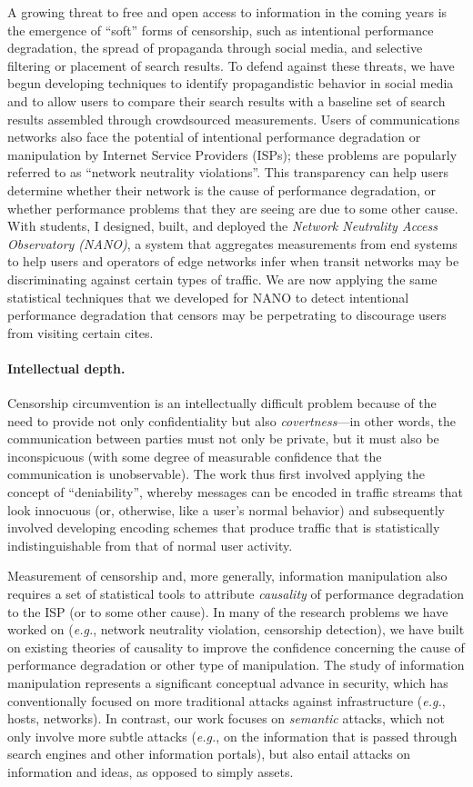 \documentclass{article}
\newcommand{\eg}{{\em e.g.}}
\begin{document}
A growing threat to free and open access to information in the coming
years is the emergence of ``soft'' forms of censorship, such as
intentional performance degradation, the spread of propaganda through
social media, and selective filtering or placement of search results.
To defend against these threats, we have begun developing techniques to
identify propagandistic behavior in social media and to allow users to
compare their search results with a baseline set of search results
assembled through crowdsourced measurements.  Users of communications
networks also face the potential of intentional performance degradation
or manipulation by Internet Service Providers (ISPs); these problems are
popularly referred to as ``network neutrality violations''.  This
transparency can help users determine whether their network is the cause
of performance degradation, or whether performance problems that they
are seeing are due to some other cause.  With students, I designed,
built, and deployed the {\em Network Neutrality Access Observatory
  (NANO)}, a system that aggregates measurements from end systems to
help users and operators of edge networks infer when transit networks
may be discriminating against certain types of traffic.  We are now
applying the same statistical techniques that we developed for NANO to
detect intentional performance degradation that censors may be
perpetrating to discourage users from visiting certain cites.

\paragraph{Intellectual depth.}  Censorship circumvention is an
intellectually difficult problem because of the need to provide not only
confidentiality but also {\em covertness}---in other words, the
communication between parties must not only be private, but it must also
be inconspicuous (with some degree of measurable confidence that the
communication is unobservable).  The work thus first involved
applying the concept of ``deniability'', whereby messages can be
encoded in traffic streams that look innocuous (or, otherwise, like a
user's normal behavior) and subsequently involved developing encoding
schemes that produce traffic that is statistically indistinguishable
from that of normal user activity.  

Measurement of censorship and, more generally, information manipulation
also requires a set of statistical tools to attribute {\em causality} of
performance degradation to the ISP (or to some other cause).  In many of
the research problems we have worked on (\eg, network neutrality
violation, censorship detection), we have built on existing theories of
causality to improve the confidence concerning the cause of performance
degradation or other type of manipulation.  The study of information
manipulation represents a significant conceptual advance in security,
which has conventionally focused on more traditional attacks against
infrastructure (\eg, hosts, networks).  In contrast, our work 
focuses on {\em semantic} attacks, which not only involve more
subtle attacks (\eg, on the information that is passed through search
engines and other information portals), but also entail attacks on
information and ideas, as opposed to simply assets.
\end{document}
